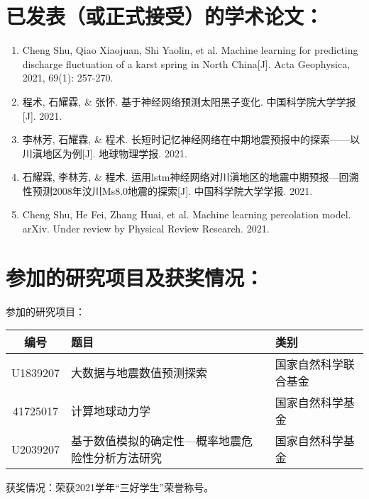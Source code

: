 
\section*{已发表（或正式接受）的学术论文：}
{\setlist[enumerate]{}
\begin{enumerate}[nosep]
  \item Cheng Shu, Qiao Xiaojuan, Shi Yaolin, et al. Machine learning for predicting discharge fluctuation of a karst spring in North China[J]. Acta Geophysica, 2021, 69(1): 257-270.
  \item 程术, 石耀霖, \& 张怀. 基于神经网络预测太阳黑子变化. 中国科学院大学学报[J]. 2021.
  \item 李林芳, 石耀霖, \& 程术. 长短时记忆神经网络在中期地震预报中的探索——以川滇地区为例[J]. 地球物理学报. 2021. 
  \item 石耀霖, 李林芳, \& 程术. 运用lstm神经网络对川滇地区的地震中期预报—回溯性预测2008年汶川Ms8.0地震的探索[J]. 中国科学院大学学报. 2021. 
  \item Cheng Shu, He Fei, Zhang Huai, et al. Machine learning percolation model. arXiv. Under review by Physical Review Research. 2021. 
\end{enumerate}}


\section*{参加的研究项目及获奖情况：}

\noindent 参加的研究项目：
\begin{table}[htbp]
\footnotesize
\begin{tabular}{cll}
  \toprule
  编号 & 题目 & 类别 \\
  \midrule
  U1839207 & 大数据与地震数值预测探索 & 国家自然科学联合基金 \\
  41725017 & 计算地球动力学 & 国家自然科学基金 \\
  U2039207 & 基于数值模拟的确定性---概率地震危险性分析方法研究 & 国家自然科学基金 \\
  \bottomrule
  \end{tabular}
\end{table}

\noindent 获奖情况：荣获2021学年“三好学生”荣誉称号。

\cleardoublepage[plain] 

